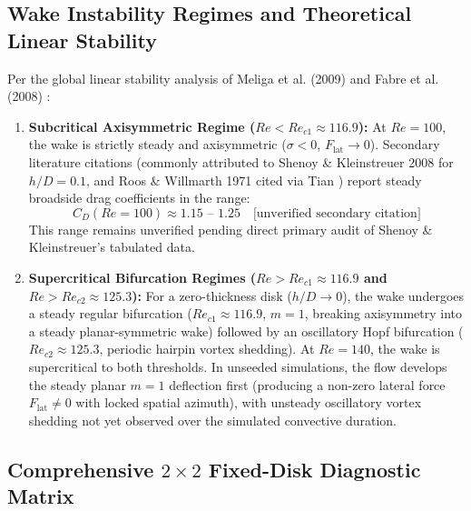 \documentclass[11pt,a4paper]{article}
\begin{document}
\subsection{Wake Instability Regimes and Theoretical Linear Stability}
Per the global linear stability analysis of Meliga et al. (2009) \cite{meliga2009} and Fabre et al. (2008) \cite{fabre2008}:
\begin{enumerate}
    \item \textbf{Subcritical Axisymmetric Regime ($Re < Re_{c1} \approx 116.9$):} At $Re = 100$, the wake is strictly steady and axisymmetric ($\sigma < 0$, $F_{\mathrm{lat}} \to 0$). Secondary literature citations (commonly attributed to Shenoy \& Kleinstreuer 2008 \cite{shenoy2008} for $h/D = 0.1$, and Roos \& Willmarth 1971 \cite{roos1971} cited via Tian \cite{tian2019}) report steady broadside drag coefficients in the range:
    \begin{equation}
    C_D(Re = 100) \approx 1.15 \text{ -- } 1.25 \quad \text{[unverified secondary citation]}
    \end{equation}
    This range remains unverified pending direct primary audit of Shenoy \& Kleinstreuer's tabulated data.
    \item \textbf{Supercritical Bifurcation Regimes ($Re > Re_{c1} \approx 116.9$ and $Re > Re_{c2} \approx 125.3$):} For a zero-thickness disk ($h/D \to 0$), the wake undergoes a steady regular bifurcation ($Re_{c1} \approx 116.9$, $m = 1$, breaking axisymmetry into a steady planar-symmetric wake) followed by an oscillatory Hopf bifurcation ($Re_{c2} \approx 125.3$, periodic hairpin vortex shedding). At $Re = 140$, the wake is supercritical to both thresholds. In unseeded simulations, the flow develops the steady planar $m = 1$ deflection first (producing a non-zero lateral force $F_{\mathrm{lat}} \neq 0$ with locked spatial azimuth), with unsteady oscillatory vortex shedding not yet observed over the simulated convective duration.
\end{enumerate}

\subsection{Comprehensive \texorpdfstring{$2 \times 2$}{2 x 2} Fixed-Disk Diagnostic Matrix}
\end{document}
